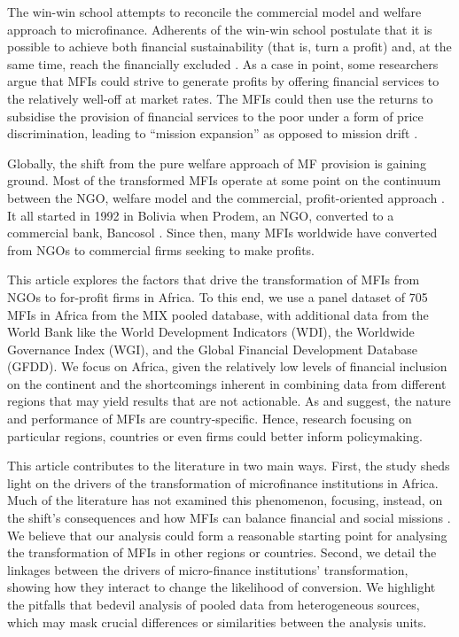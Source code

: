 \documentclass[a4paper,nobind]{templates/ociamthesis}
\begin{document}
The win-win school attempts to reconcile the commercial model and welfare approach to microfinance. Adherents of the win-win school postulate that it is possible to achieve both financial sustainability (that is, turn a profit) and, at the same time, reach the financially excluded \autocite{kodongo2013individual}. As a case in point, some researchers argue that MFIs could strive to generate profits by offering financial services to the relatively well-off at market rates. The MFIs could then use the returns to subsidise the provision of financial services to the poor under a form of price discrimination, leading to ``mission expansion'' as opposed to mission drift \autocite{mersland2010microfinance}.

Globally, the shift from the pure welfare approach of MF provision is gaining ground. Most of the transformed MFIs operate at some point on the continuum between the NGO, welfare model and the commercial, profit-oriented approach \autocite{armendariz2013subsidy,d2013unsubsidized,hishigsuren2006transformation}. It all started in 1992 in Bolivia when Prodem, an NGO, converted to a commercial bank, Bancosol \autocite{fernando2004micro,creedy2018types}. Since then, many MFIs worldwide have converted from NGOs to commercial firms seeking to make profits.

This article explores the factors that drive the transformation of MFIs from NGOs to for-profit firms in Africa. To this end, we use a panel dataset of 705 MFIs in Africa from the MIX pooled database, with additional data from the World Bank like the World Development Indicators (WDI), the Worldwide Governance Index (WGI), and the Global Financial Development Database (GFDD). We focus on Africa, given the relatively low levels of financial inclusion on the continent \autocite{demirguc2018global}and the shortcomings inherent in combining data from different regions that may yield results that are not actionable. As \textcite{d2017ngos} and \textcite{wang2015ownership} suggest, the nature and performance of MFIs are country-specific. Hence, research focusing on particular regions, countries or even firms could better inform policymaking.

This article contributes to the literature in two main ways. First, the study sheds light on the drivers of the transformation of microfinance institutions in Africa. Much of the literature has not examined this phenomenon, focusing, instead, on the shift's consequences and how MFIs can balance financial and social missions \autocite{d2013unsubsidized,forkusam2014does,mia2017mission}. We believe that our analysis could form a reasonable starting point for analysing the transformation of MFIs in other regions or countries. Second, we detail the linkages between the drivers of micro-finance institutions' transformation, showing how they interact to change the likelihood of conversion. We highlight the pitfalls that bedevil analysis of pooled data from heterogeneous sources, which may mask crucial differences or similarities between the analysis units.
\end{document}
